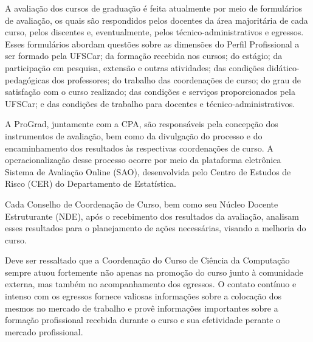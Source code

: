 A avaliação dos cursos de graduação é feita atualmente por meio de formulários de avaliação, os quais são respondidos pelos docentes da área majoritária de cada curso, pelos discentes e, eventualmente, pelos técnico-administrativos e egressos. Esses formulários abordam questões sobre as dimensões do Perfil Profissional a ser formado pela UFSCar; da formação recebida nos cursos; do estágio; da participação em pesquisa, extensão e outras atividades; das condições didático-pedagógicas dos professores; do trabalho das coordenações de curso; do grau de satisfação com o curso realizado; das condições e serviços proporcionados pela UFSCar; e das condições de trabalho para docentes e técnico-administrativos.

A ProGrad, juntamente com a CPA, são responsáveis pela concepção dos instrumentos de avaliação, bem como da divulgação do processo e do encaminhamento dos resultados às respectivas coordenações de curso. A operacionalização desse processo ocorre por meio da plataforma eletrônica Sistema de Avaliação Online (SAO), desenvolvida pelo Centro de Estudos de Risco (CER) do Departamento de Estatística.

Cada Conselho de Coordenação de Curso, bem como seu Núcleo Docente Estruturante (NDE), após o recebimento dos resultados da avaliação, analisam esses resultados para o planejamento de ações necessárias, visando a melhoria do curso.

Deve ser ressaltado que a Coordenação do Curso de Ciência da Computação sempre atuou fortemente não apenas na promoção do curso junto à comunidade externa, mas também no acompanhamento dos egressos. O contato contínuo e intenso com os egressos fornece valiosas informações sobre a colocação dos mesmos no mercado de trabalho e provê informações importantes sobre a formação profissional recebida durante o curso e sua efetividade perante o mercado profissional.

